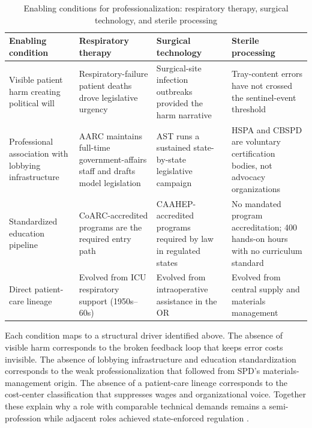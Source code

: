 \documentclass[10pt,a4paper]{article}
\begin{document}
\begin{table}[H]
\centering
\caption{Enabling conditions for professionalization: respiratory therapy, surgical technology, and sterile processing}
\label{tab:professionalization-enabling-conditions}
\small\renewcommand{\arraystretch}{1.2}\setlength{\tabcolsep}{4pt}
\begin{tabularx}{\textwidth}{|>{\raggedright\arraybackslash}p{2.5cm}|>{\raggedright\arraybackslash}X|>{\raggedright\arraybackslash}X|>{\raggedright\arraybackslash}X|}
\hline
Enabling condition & Respiratory therapy & Surgical technology & Sterile processing \\
\hline
Visible patient harm creating political will & Respiratory-failure patient deaths drove legislative urgency & Surgical-site infection outbreaks provided the harm narrative & Tray-content errors have not crossed the sentinel-event threshold \cite{joint-commission-sentinel-event-2024} \\
\hline
Professional association with lobbying infrastructure & AARC maintains full-time government-affairs staff and drafts model legislation \cite{aarc-timeline} & AST runs a sustained state-by-state legislative campaign \cite{ast-state-laws} & HSPA and CBSPD are voluntary certification bodies, not advocacy organizations \\
\hline
Standardized education pipeline & CoARC-accredited programs are the required entry path & CAAHEP-accredited programs required by law in regulated states & No mandated program accreditation; 400 hands-on hours with no curriculum standard \\
\hline
Direct patient-care lineage & Evolved from ICU respiratory support (1950s--60s) & Evolved from intraoperative assistance in the OR & Evolved from central supply and materials management \cite{ashcsp-central-service-history} \\
\hline
\end{tabularx}
\end{table}

Each condition maps to a structural driver identified above. The
absence of visible harm corresponds to the broken feedback loop that
keeps error costs invisible. The absence of lobbying infrastructure
and education standardization corresponds to the weak
professionalization that followed from SPD's materials-management
origin. The absence of a patient-care lineage corresponds to the
cost-center classification that suppresses wages and organizational
voice. Together these explain why a role with comparable technical
demands remains a semi-profession while adjacent roles achieved
state-enforced regulation \cite{etzioni-semi-professions-1969}.
\end{document}

